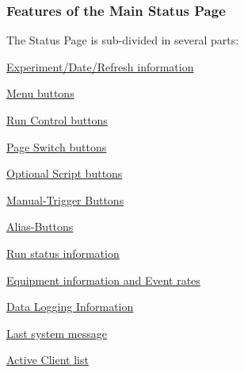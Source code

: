  \subsubsection{Features of the Main Status Page}\label{RC_mhttpd_status_page_features}
 The Status Page is sub-\/divided in several parts:
\begin{DoxyItemize}
\item \hyperlink{RC_mhttpd_status_page_features_RC_mhttpd_status_title}{Experiment/Date/Refresh information}
\item \hyperlink{RC_mhttpd_status_page_features_RC_mhttpd_status_menu_buttons}{Menu buttons}
\begin{DoxyItemize}
\item \hyperlink{RC_mhttpd_status_page_features_RC_mhttpd_status_RC_buttons}{Run Control buttons}
\item \hyperlink{RC_mhttpd_status_page_features_RC_mhttpd_status_Page_buttons}{Page Switch buttons}
\end{DoxyItemize}
\item \hyperlink{RC_mhttpd_status_page_features_RC_mhttpd_status_script_buttons}{Optional Script buttons}
\item \hyperlink{RC_mhttpd_status_page_features_RC_mhttpd_status_Manual_Trigger_buttons}{Manual-\/Trigger Buttons}
\item \hyperlink{RC_mhttpd_status_page_features_RC_mhttpd_status_Alias_buttons}{Alias-\/Buttons}
\item \hyperlink{RC_mhttpd_status_page_features_RC_mhttpd_status_Run_info}{Run status information}
\item \hyperlink{RC_mhttpd_status_page_features_RC_mhttpd_status_Equipment_info}{Equipment information and Event rates}
\item \hyperlink{RC_mhttpd_status_page_features_RC_mhttpd_status_Logger}{Data Logging Information}
\item \hyperlink{RC_mhttpd_status_page_features_RC_mhttpd_status_latest_msg}{Last system message}
\item \hyperlink{RC_mhttpd_status_page_features_RC_mhttpd_status_clients}{Active Client list}
\end{DoxyItemize}

